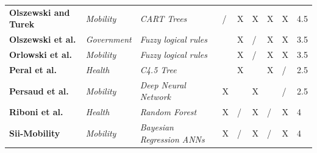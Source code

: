 \begin{table}[H]
\begin{tabular}{C{2.5cm}C{2cm}C{2cm}C{2cm}C{2cm}C{1.5cm}C{1.5cm}C{1.5cm}C{1.5cm}}
\textbf{Olszewski and Turek} \citep{olszewskiturek} & \textit{Mobility}                 & \textit{CART Trees} \citep{carttrees}                                                   & /                    & X                         & X                               & X                                 & X                        & 4.5                    \\
\textbf{Olszewski et al.} \citep{Olzewskietal}    & \textit{Government}               & \textit{Fuzzy logical rules} \citep{fuzzyenvironment}                                         &                      & X                         & /                               & X                                 & X                        & 3.5                    \\ 
\textbf{Orlowski et al.} \citep{orlowskietal}     & \textit{Mobility}                 & \textit{Fuzzy logical rules}                                         &                      & X                         & /                               & X                                 & X                        & 3.5                    \\ 
\textbf{Peral et al.} \citep{peraletal}        & \textit{Health}                   & \textit{C4.5 Tree} \citep{c45tree}                                                   &                      & X                         &                                 & X                                 & /                        & 2.5                    \\ 
\textbf{Persaud et al.} \citep{persaudetal}      & \textit{Mobility}                 & \textit{Deep Neural Network}                                         & X                    &                           & X                               &                                   & /                        & 2.5                    \\ 
\textbf{Riboni et al.} \citep{ribonietal}       & \textit{Health}                   & \textit{Random Forest} \citep{randomforest}                                               & X                    & /                         & X                               & /                                 & X                        & 4                      \\ 
\textbf{Sii-Mobility} \citep{siimobility-parking,siimobility-consult,siimobility-journal}        & \textit{Mobility}                 & \textit{Bayesian Regression ANNs} \citep{brann1,brann2,brann3}                                     & X                    & /                         & X                               & /                                 & X                        & 4                      \\

\end{tabular}
\end{table}
